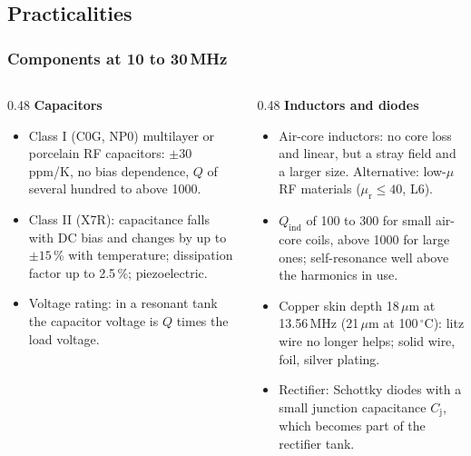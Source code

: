 \subsection{Practicalities}

\begin{frame}
	\frametitle{Components at 10 to 30\,MHz}
	\begin{columns}[T]
		\begin{column}{0.48\textwidth}
			\small
			\textbf{Capacitors}
			\begin{itemize}
				\item Class I (C0G, NP0) multilayer or porcelain RF capacitors: $\pm30$\,ppm/K, no bias dependence, $Q$ of several hundred to above 1000.
				\item Class II (X7R): capacitance falls with DC bias and changes by up to $\pm15$\,\% with temperature; dissipation factor up to 2.5\,\%; piezoelectric.
				\item Voltage rating: in a resonant tank the capacitor voltage is $Q$ times the load voltage.
			\end{itemize}
		\end{column}
		\begin{column}{0.48\textwidth}
			\small
			\textbf{Inductors and diodes}
			\begin{itemize}
				\item Air-core inductors: no core loss and linear, but a stray field and a larger size. Alternative: low-$\mu$ RF materials ($\mu_\mathrm{r}\leq40$, L6).
				\item $Q_\mathrm{ind}$ of 100 to 300 for small air-core coils, above 1000 for large ones; self-resonance well above the harmonics in use.
				\item Copper skin depth 18\,$\mu$m at 13.56\,MHz (21\,$\mu$m at 100\,$^\circ$C): litz wire no longer helps; solid wire, foil, silver plating.
				\item Rectifier: Schottky diodes with a small junction capacitance $C_\mathrm{j}$, which becomes part of the rectifier tank.
			\end{itemize}
		\end{column}
	\end{columns}
\end{frame}

